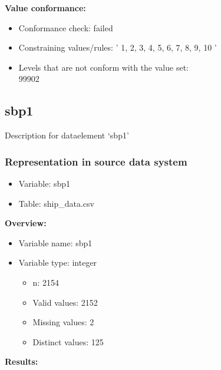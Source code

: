 \documentclass[
]{article}
\providecommand{\tightlist}{%
  \setlength{\itemsep}{0pt}\setlength{\parskip}{0pt}}
\begin{document}
\textbf{Value conformance:}

\begin{itemize}
\tightlist
\item
  Conformance check: failed
\item
  Constraining values/rules: ' 1, 2, 3, 4, 5, 6, 7, 8, 9, 10 '
\item
  Levels that are not conform with the value set:\\
  99902
\end{itemize}

\newpage

\hypertarget{sbp1}{%
\subsection{sbp1}\label{sbp1}}

Description for dataelement `sbp1'

\hypertarget{representation-in-source-data-system-21}{%
\subsubsection{\texorpdfstring{Representation in \textbf{source} data
system}{Representation in source data system}}\label{representation-in-source-data-system-21}}

\begin{itemize}
\tightlist
\item
  Variable: sbp1
\item
  Table: ship\_data.csv
\end{itemize}

\textbf{Overview:}

\begin{itemize}
\tightlist
\item
  Variable name: sbp1
\item
  Variable type: integer

  \begin{itemize}
  \tightlist
  \item
    n: 2154
  \item
    Valid values: 2152
  \item
    Missing values: 2
  \item
    Distinct values: 125
  \end{itemize}
\end{itemize}

\textbf{Results:}\\
\end{document}

